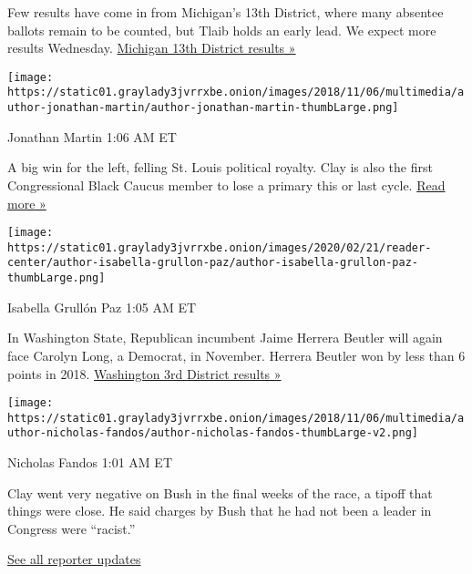 Few results have come in from Michigan's 13th District, where many
absentee ballots remain to be counted, but Tlaib holds an early lead. We
expect more results Wednesday.
\href{https://www.nytimes3xbfgragh.onion/interactive/2020/08/04/us/elections/results-michigan-house-district-13-primary-election.html?action=click\&module=ELEX_results\&pgtype=Interactive\&region=ReporterUpdates}{Michigan
13th District results »}

\texttt{[image: https://static01.graylady3jvrrxbe.onion/images/2018/11/06/multimedia/author-jonathan-martin/author-jonathan-martin-thumbLarge.png]}

Jonathan Martin 1:06 AM ET

A big win for the left, felling St. Louis political royalty. Clay is
also the first Congressional Black Caucus member to lose a primary this
or last cycle.
\href{https://www.nytimes3xbfgragh.onion/2020/08/05/us/politics/cori-bush-missouri-william-lacy-clay.html?action=click\&module=ELEX_results\&pgtype=Interactive\&region=ReporterUpdates}{Read
more »}

\texttt{[image: https://static01.graylady3jvrrxbe.onion/images/2020/02/21/reader-center/author-isabella-grullon-paz/author-isabella-grullon-paz-thumbLarge.png]}

Isabella Grullón Paz 1:05 AM ET

In Washington State, Republican incumbent Jaime Herrera Beutler will
again face Carolyn Long, a Democrat, in November. Herrera Beutler won by
less than 6 points in 2018.
\href{https://www.nytimes3xbfgragh.onion/interactive/2020/08/04/us/elections/results-washington-house-district-3-primary-election.html?action=click\&module=ELEX_results\&pgtype=Interactive\&region=ReporterUpdates}{Washington
3rd District results »}

\texttt{[image: https://static01.graylady3jvrrxbe.onion/images/2018/11/06/multimedia/author-nicholas-fandos/author-nicholas-fandos-thumbLarge-v2.png]}

Nicholas Fandos 1:01 AM ET

Clay went very negative on Bush in the final weeks of the race, a tipoff
that things were close. He said charges by Bush that he had not been a
leader in Congress were ``racist.''

\href{https://www.nytimes3xbfgragh.onion/interactive/2020/08/04/us/elections/live-analysis-arizona-kansas-michigan-missouri-primaries.html?action=click\&module=ELEX_results\&pgtype=Interactive\&region=Component}{See
all reporter updates}

